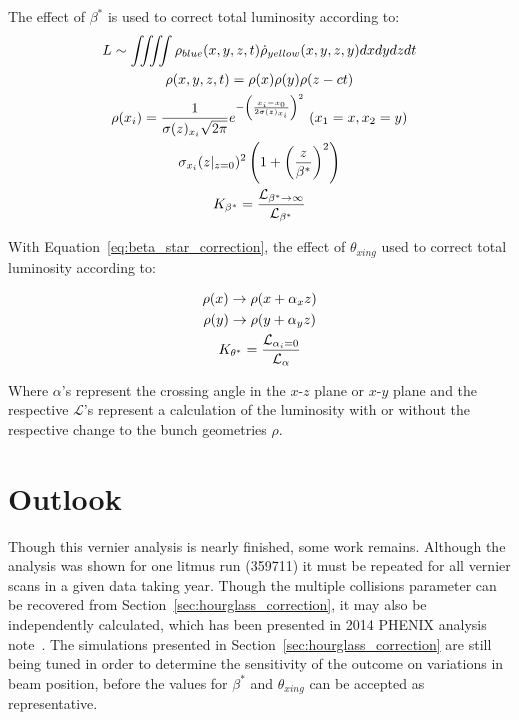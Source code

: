 {\noindent}The effect of $\beta^*$ is used to correct total luminosity according to:
\begin{gather}
  L\sim \iiiint \rho_{blue}(x,y,z,t)\dot\rho_{yellow}(x,y,z,y)dxdydzdt \\
  \rho(x,y,z,t) = \rho(x)\rho(y)\rho(z-ct) \\
  \rho(x_i) = {{1}\over{\sigma(z)_{x_i}
  \sqrt{2\pi}}}e^{-\left({{x_i-x_0}\over{2\sigma(z)_{x_i}}}\right)^2}~(x_1 = x, x_2
  = y)\\
  \sigma_{x_i}(z\vert_{z=0})^2\left(1+\left({{z}\over{\beta^*}}\right)^2\right) \\
  K_{\beta^*} =
{{\mathcal{L}_{\beta^*\rightarrow\infty}}\over{\mathcal{L}_{\beta^*}}}
\label{eq:beta_star_correction}
\end{gather}

{\noindent}With Equation~\ref{eq:beta_star_correction}, the effect of
$\theta_{xing}$ used to correct total luminosity according to: 

\begin{gather}
  \rho(x)\rightarrow\rho(x+\alpha_xz) \\
  \rho(y)\rightarrow\rho(y+\alpha_yz) \\
  K_{\theta^*} = {{\mathcal{L}_{\alpha_i = 0}}\over{\mathcal{L}_{\alpha}}}
\end{gather}

Where $\alpha$'s represent the crossing angle in the $x$-$z$ plane or $x$-$y$
plane and the respective $\mathcal{L}$'s represent a calculation of the
luminosity with or without the respective change to the bunch geometries $\rho$.

\clearpage
\section{Outlook}
\label{sec:remaining_work}

Though this vernier analysis is nearly finished, some work remains. Although the
analysis was shown for one litmus run (359711) it must be repeated for all
vernier scans in a given data taking year. Though the multiple collisions
parameter can be recovered from Section~\ref{sec:hourglass_correction}, it may
also be independently calculated, which has been presented in 2014 PHENIX
analysis note~\cite{Wolin2014}. The simulations presented in
Section~\ref{sec:hourglass_correction} are still being tuned in order to
determine the sensitivity of the outcome on variations in beam position, before
the values for $\beta^*$ and $\theta_{xing}$ can be accepted as representative.

